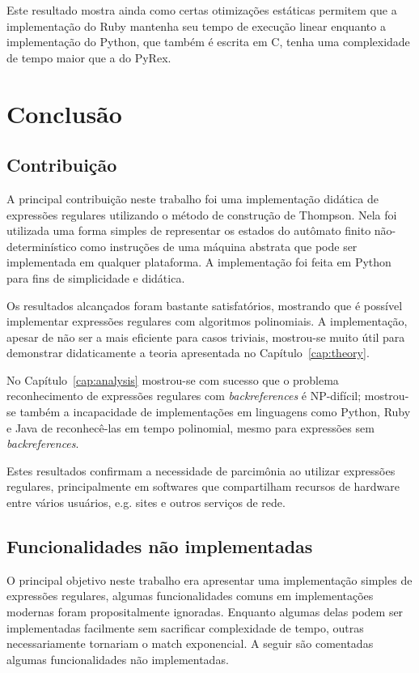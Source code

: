 \documentclass[a4paper,12pt,oneside,onecolumn]{uerj}
\begin{document}
Este resultado mostra ainda como certas otimizações estáticas permitem que a implementação do Ruby mantenha seu tempo de execução linear enquanto a implementação do Python, que também é escrita em C, tenha uma complexidade de tempo maior que a do PyRex.

\chapter{Conclusão}

\section{Contribuição}

A principal contribuição neste trabalho foi uma implementação didática de expressões regulares utilizando o método de construção de Thompson. Nela foi utilizada uma forma simples de representar os estados do autômato finito não-determinístico como instruções de uma máquina abstrata que pode ser implementada em qualquer plataforma. A implementação foi feita em Python para fins de simplicidade e didática.

Os resultados alcançados foram bastante satisfatórios, mostrando que é possível implementar expressões regulares com algoritmos polinomiais. A implementação, apesar de não ser a mais eficiente para casos triviais, mostrou-se muito útil para demonstrar didaticamente a teoria apresentada no Capítulo~\ref{cap:theory}.

No Capítulo~\ref{cap:analysis} mostrou-se com sucesso que o problema reconhecimento de expressões regulares com \emph{backreferences} é NP-difícil; mostrou-se também a incapacidade de implementações em linguagens como Python, Ruby e Java de reconhecê-las em tempo polinomial, mesmo para expressões sem \emph{backreferences}.

Estes resultados confirmam a necessidade de parcimônia ao utilizar expressões regulares, principalmente em softwares que compartilham recursos de hardware entre vários usuários, e.g. sites e outros serviços de rede.

\section{Funcionalidades não implementadas}

O principal objetivo neste trabalho era apresentar uma implementação simples de expressões regulares, algumas funcionalidades comuns em implementações modernas foram propositalmente ignoradas. Enquanto algumas delas podem ser implementadas facilmente sem sacrificar complexidade de tempo, outras necessariamente tornariam o match exponencial. A seguir são comentadas algumas funcionalidades não implementadas.
\end{document}
